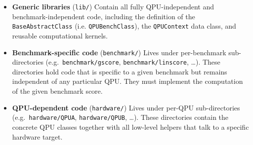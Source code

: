 \begin{itemize}
  \item \textbf{Generic libraries} (\texttt{lib/})  
        Contain all fully QPU-independent and benchmark-independent code,  
        including the definition of the \texttt{BaseAbstractClass} (i.e.  
        \texttt{QPUBenchClass}), the \texttt{QPUContext}  
        data class, and reusable computational kernels.

  \item \textbf{Benchmark-specific code} (\texttt{benchmark/})  
        Lives under per-benchmark sub-directories (e.g.\ \texttt{benchmark/gscore},  
        \texttt{benchmark/linscore}, \ldots).  
        These directories hold code that is specific to a given benchmark but  
        remains independent of any particular QPU.
        They must implement the computation of the given benchmark score.

  \item \textbf{QPU-dependent code} (\texttt{hardware/})  
        Lives under per-QPU sub-directories (e.g.\ \texttt{hardware/QPUA},  
        \texttt{hardware/QPUB}, \ldots).  
        These directories contain the concrete QPU classes together with  
        all low-level helpers that talk to a specific hardware target.
\end{itemize}


